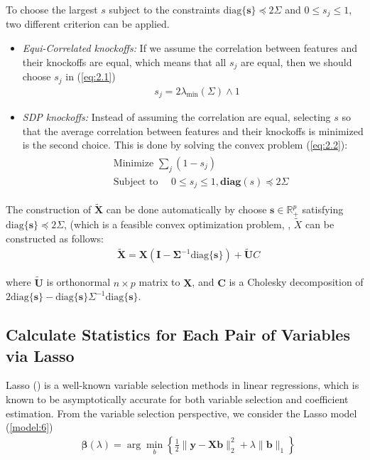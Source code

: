\documentclass{uwstat572}
\newcommand\diag{\text{diag}}
\begin{document}
To choose the largest $s$ subject to the constraints $\diag\{\bm{s} \}\preceq 2\Sigma$ and $0\leq s_j\leq 1$, two different criterion can be applied. 
\begin{itemize}
\item {\it Equi-Correlated knockoffs:} If we assume the correlation between features and their knockoffs are equal, which means that all $s_j$ are equal, then we should choose $s_j$ in (\ref{eq:2.1})
\begin{align}\label{eq:2.1}
& s_j = 2\lambda_{\min}(\Sigma)\wedge 1
\end{align}
\item {\it SDP knockoffs:} Instead of assuming the correlation are equal, selecting $s$ so that the average correlation between features and their knockoffs is minimized is the second choice. This is done by solving the convex problem (\ref{eq:2.2}):
\begin{align}\label{eq:2.2}
&\begin{aligned}
& \text{Minimize }\sum_j(1-s_j)\\
&\text{Subject to }\quad 0\leq s_j\leq 1, \textbf{diag}(s) \preceq 2\Sigma
\end{aligned}
\end{align}
\end{itemize}

The construction of $\bm{\tilde X}$ can be done automatically by choose $\bm{s}\in\mathbb{R}_+^p$ satisfying $\diag\{\bm{s} \}\preceq 2\Sigma$, (which is a feasible convex optimization problem, \cite{boyd2004convex}, $\tilde{X}$ can be constructed as follows:
\begin{align}\label{eq:4}
& \tilde{\bm{X}} = \bm{X}(\bm{I}- \bm{\Sigma}^{-1}\text{diag}\{\bm{s} \}) + \bm{\tilde U}C 
\end{align}

where $\tilde{\bm{U}}$ is orthonormal $n\times p$ matrix to $\bm{X}$, and $\bm{C}$ is a Cholesky decomposition of $2\diag\{\bm{s}\} - \diag\{\bm{s}\} \Sigma^{-1} \diag\{\bm{s}\}$.

\subsection{Calculate Statistics for Each Pair of Variables via Lasso}
Lasso (\cite{tibshirani1996regression}) is a well-known variable selection methods in linear regressions, which is known to be asymptotically accurate for both variable selection and coefficient estimation. From the variable selection perspective, we consider the Lasso model (\ref{model:6})
\begin{align}\label{model:6}
& \hat{\bm{\beta}}(\lambda) = \arg\min_b \left\{\frac{1}{2}\|\bm{y} - \bm{X}\bm{b} \|_2^2 + \lambda\|\bm{b}\|_1 \right\}
\end{align}
\end{document}
